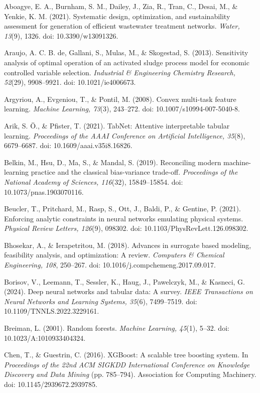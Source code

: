 \documentclass[a4paper,fleqn]{cas-sc}
\begin{document}
\noindent Aboagye, E. A., Burnham, S. M., Dailey, J., Zia, R., Tran, C., Desai, M., \& Yenkie, K. M. (2021). Systematic design, optimization, and sustainability assessment for generation of efficient wastewater treatment networks. \textit{Water, 13}(9), 1326. doi: 10.3390/w13091326.

\noindent Araujo, A. C. B. de, Gallani, S., Mulas, M., \& Skogestad, S. (2013). Sensitivity analysis of optimal operation of an activated sludge process model for economic controlled variable selection. \textit{Industrial \& Engineering Chemistry Research, 52}(29), 9908--9921. doi: 10.1021/ie4006673.

\noindent Argyriou, A., Evgeniou, T., \& Pontil, M. (2008). Convex multi-task feature learning. \textit{Machine Learning, 73}(3), 243--272. doi: 10.1007/s10994-007-5040-8.

\noindent Arik, S. \"O., \& Pfister, T. (2021). TabNet: Attentive interpretable tabular learning. \textit{Proceedings of the AAAI Conference on Artificial Intelligence, 35}(8), 6679--6687. doi: 10.1609/aaai.v35i8.16826.

\noindent Belkin, M., Hsu, D., Ma, S., \& Mandal, S. (2019). Reconciling modern machine-learning practice and the classical bias-variance trade-off. \textit{Proceedings of the National Academy of Sciences, 116}(32), 15849--15854. doi: 10.1073/pnas.1903070116.

\noindent Beucler, T., Pritchard, M., Rasp, S., Ott, J., Baldi, P., \& Gentine, P. (2021). Enforcing analytic constraints in neural networks emulating physical systems. \textit{Physical Review Letters, 126}(9), 098302. doi: 10.1103/PhysRevLett.126.098302.

\noindent Bhosekar, A., \& Ierapetritou, M. (2018). Advances in surrogate based modeling, feasibility analysis, and optimization: A review. \textit{Computers \& Chemical Engineering, 108}, 250--267. doi: 10.1016/j.compchemeng.2017.09.017.

\noindent Borisov, V., Leemann, T., Sessler, K., Haug, J., Pawelczyk, M., \& Kasneci, G. (2024). Deep neural networks and tabular data: A survey. \textit{IEEE Transactions on Neural Networks and Learning Systems, 35}(6), 7499--7519. doi: 10.1109/TNNLS.2022.3229161.

\noindent Breiman, L. (2001). Random forests. \textit{Machine Learning, 45}(1), 5--32. doi: 10.1023/A:1010933404324.

\noindent Chen, T., \& Guestrin, C. (2016). XGBoost: A scalable tree boosting system. In \textit{Proceedings of the 22nd ACM SIGKDD International Conference on Knowledge Discovery and Data Mining} (pp. 785--794). Association for Computing Machinery. doi: 10.1145/2939672.2939785.
\end{document}
